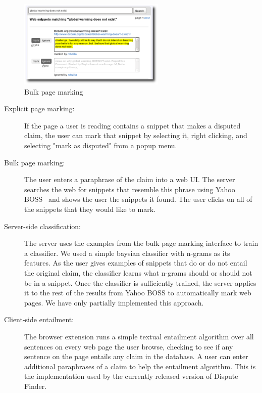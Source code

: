 \documentclass{www2010-submission}
\newcommand{\todo}[1]{}
\begin{document}
\begin{figure}[tb]
	\begin{center}
	\includegraphics[width=7cm]{pictures/training.png}
	\caption{Bulk page marking}
	\label{training}
	\end{center}
\end{figure}


\begin{description}
\item[Explicit page marking:] If the page a user is reading contains a snippet that makes a disputed claim, the user can mark that snippet by selecting it, right clicking, and selecting "mark as disputed" from a popup menu.

\item[Bulk page marking:] The user enters a paraphrase of the claim into a web UI. The server searches the web for snippets that resemble this phrase using Yahoo BOSS~\cite{boss?} and shows the user the snippets it found. The user clicks on all of the snippets that they would like to mark.

\item[Server-side classification:] The server uses the examples from the bulk page marking interface to train a classifier. We used a simple baysian classifier with n-grams as its features. As the user gives examples of snippets that do or do not entail the original claim, the classifier learns what n-grams should or should not be in a snippet. Once the classifier is sufficiently trained, the server applies it to the rest of the results from Yahoo BOSS to automatically mark web pages. We have only partially implemented this approach.

\todo{Has anyone done something like this before.}
\todo{We only partially implemented this approach}

\item[Client-side entailment:] The browser extension runs a simple textual entailment algorithm over all sentences on every web page the user browse, checking to see if any sentence on the page entails any claim in the database. A user can enter additional paraphrases of a claim to help the entailment algorithm. This is the implementation used by the currently released version of Dispute Finder.
\end{description}
\end{document}
